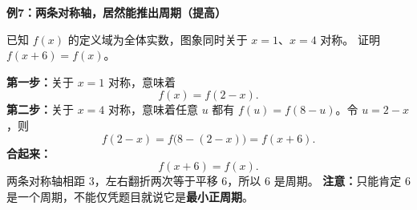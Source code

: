 \clearpage
\begin{examplebox}
\textbf{\textcolor{CExample}{例7：两条对称轴，居然能推出周期（提高）}}


  已知 $f(x)$ 的定义域为全体实数，图象同时关于 $x=1$、$x=4$ 对称。
  证明 $f(x+6)=f(x)$。

  \textbf{第一步：}关于 $x=1$ 对称，意味着
  \[
      f(x)=f(2-x).
  \]
  \textbf{第二步：}关于 $x=4$ 对称，意味着任意 $u$ 都有
  $f(u)=f(8-u)$。令 $u=2-x$，则
  \[
      f(2-x)=f\bigl(8-(2-x)\bigr)=f(x+6).
  \]
  \textbf{合起来：}
  \[
      \boxed{f(x+6)=f(x)}.
  \]
  两条对称轴相距 $3$，左右翻折两次等于平移 $6$，所以 $6$ 是周期。
  \textbf{注意：}只能肯定 $6$ 是一个周期，不能仅凭题目就说它是\textbf{最小正周期}。
\end{examplebox}
